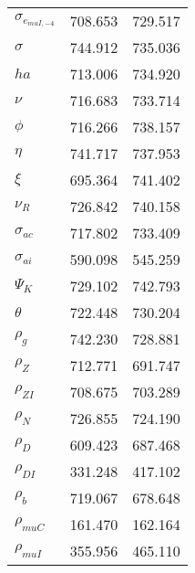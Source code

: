 \begin{center}
\begin{longtable}{lcc}
$ \sigma_{{e_{muI,-4}}}   $	 & 	     708.653	 & 	     729.517 \\ 
$ {\sigma}                $	 & 	     744.912	 & 	     735.036 \\ 
$ {ha}                    $	 & 	     713.006	 & 	     734.920 \\ 
$ \nu                     $	 & 	     716.683	 & 	     733.714 \\ 
$ {\phi}                  $	 & 	     716.266	 & 	     738.157 \\ 
$ {\eta}                  $	 & 	     741.717	 & 	     737.953 \\ 
$ \xi                     $	 & 	     695.364	 & 	     741.402 \\ 
$ {\nu_R}                 $	 & 	     726.842	 & 	     740.158 \\ 
$ {\sigma_{ac}}           $	 & 	     717.802	 & 	     733.409 \\ 
$ {\sigma_{ai}}           $	 & 	     590.098	 & 	     545.259 \\ 
$ {\Psi_{K}}              $	 & 	     729.102	 & 	     742.793 \\ 
$ {\theta}                $	 & 	     722.448	 & 	     730.204 \\ 
$ {\rho_g}                $	 & 	     742.230	 & 	     728.881 \\ 
$ {\rho_Z}                $	 & 	     712.771	 & 	     691.747 \\ 
$ {\rho_{ZI}}             $	 & 	     708.675	 & 	     703.289 \\ 
$ {\rho_N}                $	 & 	     726.855	 & 	     724.190 \\ 
$ {\rho_D}                $	 & 	     609.423	 & 	     687.468 \\ 
$ {\rho_{DI}}             $	 & 	     331.248	 & 	     417.102 \\ 
$ {\rho_b}                $	 & 	     719.067	 & 	     678.648 \\ 
$ {\rho_{muC}}            $	 & 	     161.470	 & 	     162.164 \\ 
$ {\rho_{muI}}            $	 & 	     355.956	 & 	     465.110 \\ 
\end{longtable}
 \end{center}
